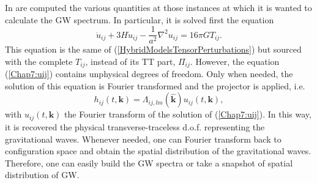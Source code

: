 \documentclass[11pt,a4paper,twoside]{book}
\begin{document}
In \cite{Chap7:HybridModel} are computed the various quantities at those instances at which it is wanted to calculate the GW spectrum. In particular, it is solved first the equation
\begin{equation}
	\label{Chap7:uij}
	\ddot{u}_{ij} + 3H\dot{u}_{ij} - \frac{1}{a^{2}}\nabla^{2}u_{ij}=16\pi GT_{ij}.
\end{equation}
This equation is the same of (\ref{HybridModelsTensorPerturbations}) but sourced with the complete $ T_{ij} $, instead of  its TT part, $ \Pi_{ij} $. However, the equation (\ref{Chap7:uij}) contains unphysical degrees of freedom.
Only when needed, the solution of this equation is Fourier transformed and the projector is applied, i.e.
\begin{equation}
\label{Chap7:projectorEquation}
h_{ij}(t,\textbf{k})=\Lambda_{ij,lm}(\hat{\textbf{k}})u_{ij}(t,\textbf{k}),
\end{equation}
with $ u_{ij}(t,\textbf{k}) $  the Fourier transform of the solution of (\ref{Chap7:uij}). In this way, it is recovered the physical transverse-traceless d.o.f. representing the gravitational waves. Whenever needed, one can Fourier transform back to configuration space and obtain the spatial distribution of the gravitational waves. Therefore, one can easily build the GW spectra or take  a snapshot of spatial distribution of GW.
\end{document}
